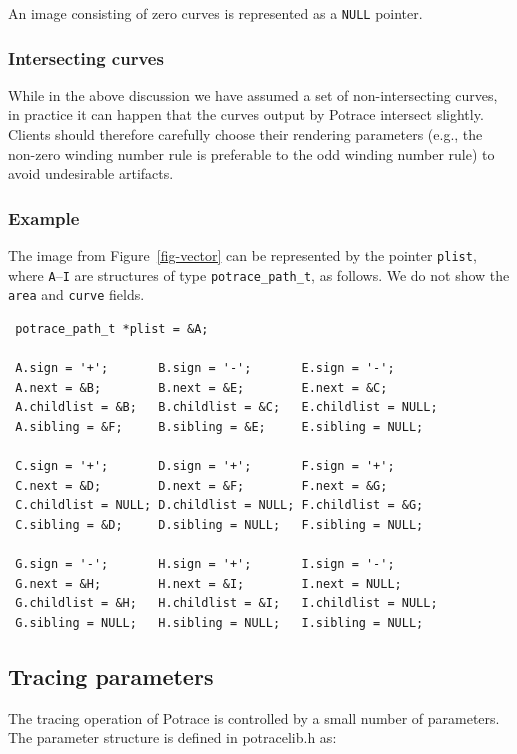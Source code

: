 \documentclass{article}
\begin{document}
An image consisting of zero curves is represented as a \verb!NULL! pointer.

\subsubsection{Intersecting curves}

While in the above discussion we have assumed a set of
non-intersecting curves, in practice it can happen that the curves
output by Potrace intersect slightly. Clients should therefore
carefully choose their rendering parameters (e.g., the non-zero
winding number rule is preferable to the odd winding number rule) to
avoid undesirable artifacts.

\subsubsection{Example}

The image from Figure~\ref{fig-vector} can be represented by the
pointer \verb!plist!, where {\tt A}--{\tt I} are structures
of type \verb!potrace_path_t!, as follows.  We do not show the
\verb!area! and \verb!curve! fields.
{\small
\begin{verbatim}
 potrace_path_t *plist = &A;

 A.sign = '+';       B.sign = '-';       E.sign = '-';
 A.next = &B;        B.next = &E;        E.next = &C;
 A.childlist = &B;   B.childlist = &C;   E.childlist = NULL;
 A.sibling = &F;     B.sibling = &E;     E.sibling = NULL;

 C.sign = '+';       D.sign = '+';       F.sign = '+';
 C.next = &D;        D.next = &F;        F.next = &G;
 C.childlist = NULL; D.childlist = NULL; F.childlist = &G;
 C.sibling = &D;     D.sibling = NULL;   F.sibling = NULL;

 G.sign = '-';       H.sign = '+';       I.sign = '-';
 G.next = &H;        H.next = &I;        I.next = NULL;
 G.childlist = &H;   H.childlist = &I;   I.childlist = NULL;
 G.sibling = NULL;   H.sibling = NULL;   I.sibling = NULL;
\end{verbatim}
}

\subsection{Tracing parameters}\label{ssec-parameters}

The tracing operation of Potrace is controlled by a small number of
parameters. The parameter structure is defined in potracelib.h as:
\end{document}
